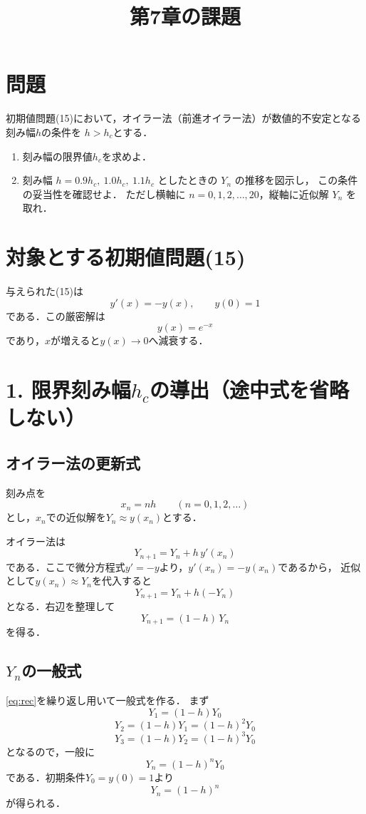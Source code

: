 \documentclass[a4paper,11pt]{jsarticle}
\title{第7章の課題}
\author{}
\date{}
\begin{document}
\maketitle

\section{問題}
初期値問題(15)において，オイラー法（前進オイラー法）が数値的不安定となる刻み幅$h$の条件を
$h>h_c$とする．
\begin{enumerate}
  \item 刻み幅の限界値$h_c$を求めよ．
  \item 刻み幅 $h=0.9h_c,\ 1.0h_c,\ 1.1h_c$ としたときの $Y_n$ の推移を図示し，
        この条件の妥当性を確認せよ．
        ただし横軸に $n=0,1,2,\dots,20$，縦軸に近似解 $Y_n$ を取れ．
\end{enumerate}

\section{対象とする初期値問題(15)}
与えられた(15)は
\begin{equation}
y'(x)=-y(x),\qquad y(0)=1
\label{eq:ivp}
\end{equation}
である．この厳密解は
\[
y(x)=e^{-x}
\]
であり，$x$が増えると$y(x)\to 0$へ減衰する．

\section{1. 限界刻み幅$h_c$の導出（途中式を省略しない）}

\subsection{オイラー法の更新式}
刻み点を
\[
x_n = nh\qquad (n=0,1,2,\dots)
\]
とし，$x_n$での近似解を$Y_n \approx y(x_n)$とする．

オイラー法は
\[
Y_{n+1}=Y_n + h\,y'(x_n)
\]
である．ここで微分方程式$y'=-y$より，$y'(x_n)=-y(x_n)$であるから，
近似として$y(x_n)\approx Y_n$を代入すると
\[
Y_{n+1} = Y_n + h(-Y_n)
\]
となる．右辺を整理して
\begin{equation}
Y_{n+1} = (1-h)\,Y_n
\label{eq:rec}
\end{equation}
を得る．

\subsection{$Y_n$の一般式}
\eqref{eq:rec}を繰り返し用いて一般式を作る．
まず
\[
Y_1=(1-h)Y_0
\]
\[
Y_2=(1-h)Y_1=(1-h)^2Y_0
\]
\[
Y_3=(1-h)Y_2=(1-h)^3Y_0
\]
となるので，一般に
\begin{equation}
Y_n=(1-h)^nY_0
\label{eq:general}
\end{equation}
である．初期条件$Y_0=y(0)=1$より
\begin{equation}
Y_n=(1-h)^n
\label{eq:Yn}
\end{equation}
が得られる．
\end{document}

